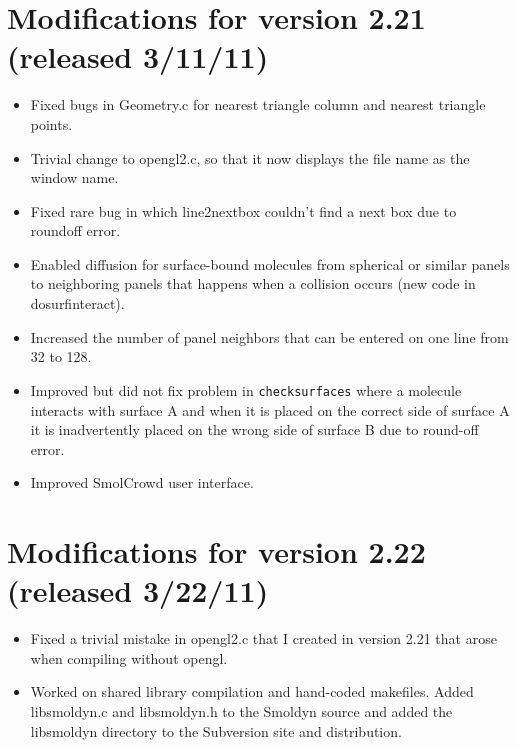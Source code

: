 \documentclass {scrbook}
\newcommand {\ttt} {\texttt}
\begin{document}
\section{Modifications for version 2.21 (released 3/11/11)}
\begin{itemize}
\item Fixed bugs in Geometry.c for nearest triangle column and nearest triangle points.
\item Trivial change to opengl2.c, so that it now displays the file name as the window name.
\item Fixed rare bug in which line2nextbox couldn't find a next box due to roundoff error.
\item Enabled diffusion for surface-bound molecules from spherical or similar panels to neighboring panels that happens when a collision occurs (new code in dosurfinteract).
\item Increased the number of panel neighbors that can be entered on one line from 32 to 128.
\item Improved but did not fix problem in \ttt{checksurfaces} where a molecule interacts with surface A and when it is placed on the correct side of surface A it is inadvertently placed on the wrong side of surface B due to round-off error.
\item Improved SmolCrowd user interface.
\end{itemize}

\section{Modifications for version 2.22 (released 3/22/11)}
\begin{itemize}
\item Fixed a trivial mistake in opengl2.c that I created in version 2.21 that arose when compiling without opengl.
\item Worked on shared library compilation and hand-coded makefiles. Added libsmoldyn.c and libsmoldyn.h to the Smoldyn source and added the libsmoldyn directory to the Subversion site and distribution.
\end{itemize}
\end{document}
